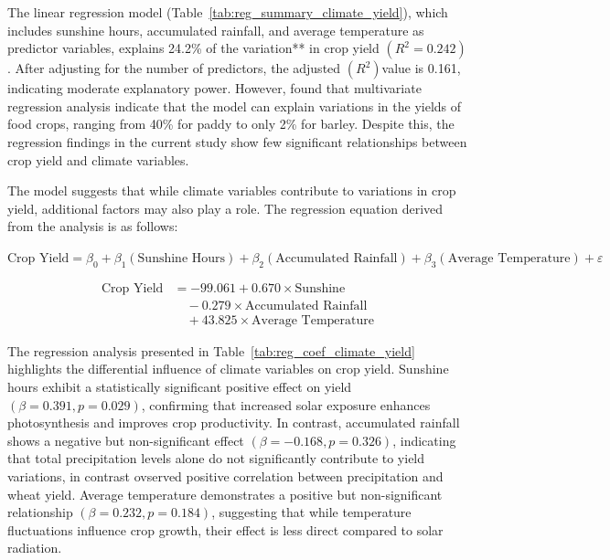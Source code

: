 The linear regression model (Table~\ref{tab:reg_summary_climate_yield}), which includes sunshine hours, accumulated rainfall, and average temperature as predictor variables, explains 24.2\% of the variation** in crop yield $(R^2 = 0.242)$. After adjusting for the number of predictors, the adjusted $(R^2) $value is 0.161, indicating moderate explanatory power. However, \citet{maharjanEffectClimateVariables2013} found that multivariate regression analysis indicate that the model can explain variations in the yields of food crops, ranging from 40\% for paddy to only 2\% for barley. Despite this, the regression findings in the current study show few significant relationships between crop yield and climate variables.

The model suggests that while climate variables contribute to variations in crop yield, additional factors may also play a role. The regression equation derived from the analysis is as follows:  

$
\text{Crop Yield} = \beta_0 + \beta_1 (\text{Sunshine Hours}) + \beta_2 (\text{Accumulated Rainfall}) + \beta_3 (\text{Average Temperature}) + \varepsilon
$

\begin{equation}
    \begin{split}
        \text{Crop Yield} &= -99.061 + 0.670 \times \text{Sunshine} \\
        &\quad - 0.279 \times \text{Accumulated Rainfall} \\
        &\quad + 43.825 \times \text{Average Temperature}
    \end{split}
\end{equation}

The regression analysis presented in Table~\ref{tab:reg_coef_climate_yield} highlights the differential influence of climate variables on crop yield. Sunshine hours exhibit a statistically significant positive effect on yield $(\beta = 0.391, p = 0.029)$, confirming that increased solar exposure enhances photosynthesis and improves crop productivity. In contrast, accumulated rainfall shows a negative but non-significant effect $(\beta = -0.168, p = 0.326)$, indicating that total precipitation levels alone do not significantly contribute to yield variations, in contrast \citet{thapa-parajuliImpactClimateChange2016} ovserved positive correlation between precipitation and wheat yield. Average temperature demonstrates a positive but non-significant relationship $(\beta = 0.232, p = 0.184)$, suggesting that while temperature fluctuations influence crop growth, their effect is less direct compared to solar radiation.

